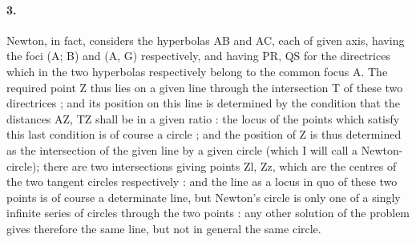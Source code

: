 \documentclass[11pt,a4paper]{book}
\begin{document}
\paragraph{3.} Newton,   in    fact,    considers   the    hyperbolas   AB    and    AC,   each    of   given    axis,
having    the     foci    (A;    B)     and     (A,    G)    respectively,     and     having    PR,     QS    for    the
directrices    which     in    the    two    hyperbolas    respectively    belong    to    the    common    focus
A.     The   required   point   Z  thus   lies   on   a   given    line    through    the    intersection    T    of
these   two   directrices ;    and   its   position   on    this   line    is    determined    by    the    condition
that   the   distances   AZ,    TZ  shall   be   in   a   given   ratio :    the    locus  of  the  points   which
satisfy    this    last    condition    is    of    course    a    circle ;     and    the    position    of    Z    is    thus
determined   as   the   intersection  of  the  given  line   by   a   given   circle  (which  I  will  call  a
Newton-circle);    there    are   two   intersections   giving  points  Zl,  Zz,  which  are  the  centres
of  the   two   tangent   circles   respectively :    and   the   line   as   a   locus   in  quo  of  these  two
points   is   of  course    a   determinate   line,   but   Newton's   circle   is    only   one    of    a    singly
infinite   series   of    circles   through    the   two   points :    any    other   solution    of    the    problem
gives  therefore  the  same  line,  but  not  in  general  the  same  circle.
\end{document}
